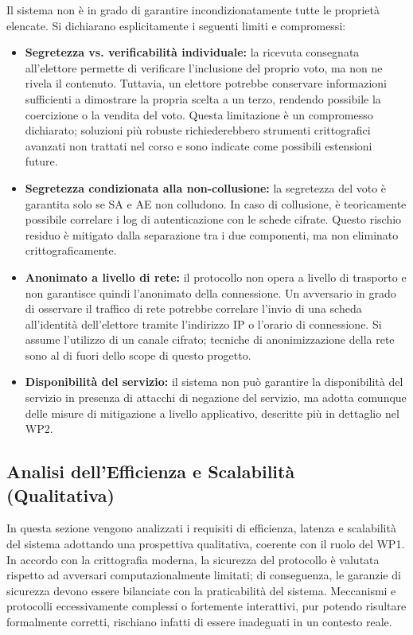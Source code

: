 \documentclass[12pt,a4paper]{article}
\begin{document}
Il sistema non è in grado di garantire incondizionatamente tutte le proprietà elencate. Si
dichiarano esplicitamente i seguenti limiti e compromessi:

\begin{itemize}
  \item \textbf{Segretezza vs. verificabilità individuale:} la ricevuta consegnata all'elettore
    permette di verificare l'inclusione del proprio voto, ma non ne rivela il contenuto.
    Tuttavia, un elettore potrebbe conservare informazioni sufficienti a dimostrare la propria
    scelta a un terzo, rendendo possibile la coercizione o la vendita del voto. Questa
    limitazione è un compromesso dichiarato; soluzioni più robuste richiederebbero strumenti
    crittografici avanzati non trattati nel corso e sono indicate come possibili estensioni
    future.
  \item \textbf{Segretezza condizionata alla non-collusione:} la segretezza del voto è
    garantita solo se SA e AE non colludono. In caso di collusione, è teoricamente possibile
    correlare i log di autenticazione con le schede cifrate. Questo rischio residuo è mitigato
    dalla separazione tra i due componenti, ma non eliminato crittograficamente.
  \item \textbf{Anonimato a livello di rete:} il protocollo non opera a livello di trasporto e
    non garantisce quindi l'anonimato della connessione. Un avversario in grado di osservare il
    traffico di rete potrebbe correlare l'invio di una scheda all'identità dell'elettore tramite
    l'indirizzo IP o l'orario di connessione. Si assume l'utilizzo di un canale cifrato;
    tecniche di anonimizzazione della rete sono al di fuori dello scope di questo progetto.
  \item \textbf{Disponibilità del servizio:} il sistema non può garantire la disponibilità del
    servizio in presenza di attacchi di negazione del servizio, ma adotta comunque delle misure
    di mitigazione a livello applicativo, descritte più in dettaglio nel WP2.
\end{itemize}

\subsection{Analisi dell'Efficienza e Scalabilità (Qualitativa)}

In questa sezione vengono analizzati i requisiti di efficienza, latenza e scalabilità del
sistema adottando una prospettiva qualitativa, coerente con il ruolo del WP1. In accordo con la
crittografia moderna, la sicurezza del protocollo è valutata rispetto ad avversari
computazionalmente limitati; di conseguenza, le garanzie di sicurezza devono essere bilanciate
con la praticabilità del sistema. Meccanismi e protocolli eccessivamente complessi o fortemente
interattivi, pur potendo risultare formalmente corretti, rischiano infatti di essere inadeguati
in un contesto reale.
\end{document}
